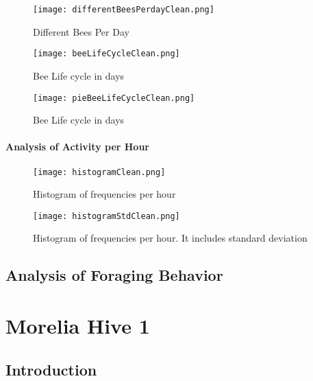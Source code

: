 \documentclass[11pt,fleqn]{book} %
\begin{document}
\begin{figure}[h!]%
\centering%
\texttt{[image: differentBeesPerdayClean.png]}%
\caption{Different Bees Per Day}%
\end{figure}

%


\begin{figure}[h!]%
\centering%
\texttt{[image: beeLifeCycleClean.png]}%
\caption{Bee Life cycle in days}%
\end{figure}

%


\begin{figure}[h!]%
\centering%
\texttt{[image: pieBeeLifeCycleClean.png]}%
\caption{Bee Life cycle in days}%
\end{figure}

%
\subsection{Analysis of Activity per Hour}%
\label{subsec:Analysis of Activity per Hour}%


\begin{figure}[h!]%
\centering%
\texttt{[image: histogramClean.png]}%
\caption{Histogram of frequencies per hour}%
\end{figure}

%


\begin{figure}[h!]%
\centering%
\texttt{[image: histogramStdClean.png]}%
\caption{Histogram of frequencies per hour. It includes standard deviation}%
\end{figure}

\chapter{Analysis of Foraging Behavior}
\part{Morelia Hive 1}
\chapter{Introduction} 
\normalsize%
\end{document}
